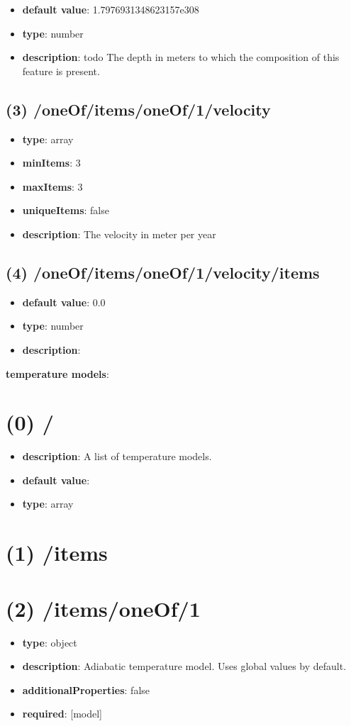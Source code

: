 \begin{itemize}[leftmargin=3em]\item {\bf default value}: 1.7976931348623157e308
\item {\bf type}: number
\item {\bf description}: todo The depth in meters to which the composition of this feature is present.
\end{itemize}\subsection{(3) /oneOf/items/oneOf/1/velocity}
\begin{itemize}[leftmargin=3em]\item {\bf type}: array
\item {\bf minItems}: 3
\item {\bf maxItems}: 3
\item {\bf uniqueItems}: false
\item {\bf description}: The velocity in meter per year
\end{itemize}\subsection{(4) /oneOf/items/oneOf/1/velocity/items}
\begin{itemize}[leftmargin=4em]\item {\bf default value}: 0.0
\item {\bf type}: number
\item {\bf description}: 
\end{itemize}\item {\bf temperature models}: \section{(0) /}
\begin{itemize}[leftmargin=0em]\item {\bf description}: A list of temperature models.
\item {\bf default value}: 
\item {\bf type}: array
\end{itemize}\section{(1) /items}

\section{(2) /items/oneOf/1}
\begin{itemize}[leftmargin=2em]\item {\bf type}: object
\item {\bf description}: Adiabatic temperature model. Uses global values by default.
\item {\bf additionalProperties}: false
\item {\bf required}: [model]\end{itemize}
